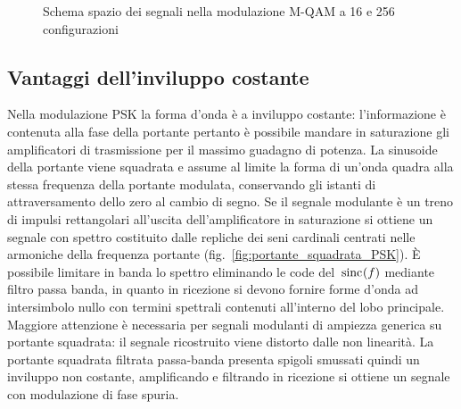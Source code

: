 \begin{figure}[ht]
	\centering
	\quad{}
	\caption{Schema spazio dei segnali nella modulazione M-\ac{QAM} a 16 e 256 configurazioni}
\end{figure}

\subsection{Vantaggi dell'inviluppo costante}
Nella modulazione \ac{PSK} la forma d'onda è a inviluppo costante: l'informazione è contenuta alla fase della portante pertanto è possibile mandare in saturazione gli amplificatori di trasmissione per il massimo guadagno di potenza. La sinusoide della portante viene squadrata e assume al limite la forma di un'onda quadra alla stessa frequenza della portante modulata, conservando gli istanti di attraversamento dello zero al cambio di segno. Se il segnale modulante è un treno di impulsi rettangolari all'uscita dell'amplificatore in saturazione si ottiene un segnale con spettro costituito dalle repliche dei seni cardinali centrati nelle armoniche della frequenza portante (fig.~\ref{fig:portante_squadrata_PSK}). \`{E} possibile limitare in banda lo spettro eliminando le code del $\,{\operatorname{sinc}}^{}\!\left({f}\right)$ mediante filtro passa banda, in quanto in ricezione si devono fornire forme d'onda ad intersimbolo nullo con termini spettrali contenuti all'interno del lobo principale. Maggiore attenzione è necessaria per segnali modulanti di ampiezza generica su portante squadrata: il segnale ricostruito viene distorto dalle non linearità. La portante squadrata filtrata passa-banda presenta spigoli smussati quindi un inviluppo non costante, amplificando e filtrando in ricezione si ottiene un segnale con modulazione di fase spuria.

